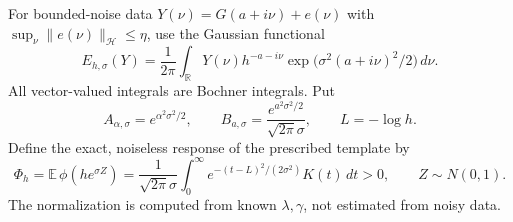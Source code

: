 For bounded-noise data $Y(\nu)=G(a+i\nu)+e(\nu)$ with
$\sup_\nu\|e(\nu)\|_{\mathcal H}\le\eta$, use the Gaussian functional
\begin{equation}\label{eq:branchgaussian}
 E_{h,\sigma}(Y)=\frac1{2\pi}\int_{\mathbb R}
 Y(\nu)h^{-a-i\nu}\exp\bigl(\sigma^2(a+i\nu)^2/2\bigr)\,d\nu.
\end{equation}
All vector-valued integrals are Bochner integrals. Put
\[
 A_{\alpha,\sigma}=e^{\alpha^2\sigma^2/2},\qquad
 B_{a,\sigma}=\frac{e^{a^2\sigma^2/2}}{\sqrt{2\pi}\sigma},
 \qquad L=-\log h.
\]
Define the exact, noiseless response of the prescribed template by
\begin{equation}\label{eq:branchresponse}
 \Phi_h=\mathbb E\,\phi(he^{\sigma Z})
 =\frac1{\sqrt{2\pi}\sigma}\int_0^\infty
 e^{-(t-L)^2/(2\sigma^2)}K(t)\,dt>0,
 \qquad Z\sim N(0,1).
\end{equation}
The normalization is computed from known $\lambda,\gamma$, not estimated
from noisy data.

